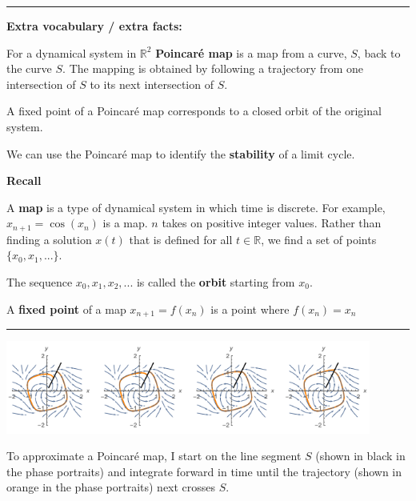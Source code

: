 \documentclass[12pt,letterpaper,noanswers]{exam}
\begin{document}
\vspace{0.2cm}
\hrule
\vspace{0.2cm}


\noindent \textbf{Extra vocabulary / extra facts:}
\begin{tcolorbox}
For a dynamical system in $\mathbb{R}^2$ \textbf{Poincar\'e map} is a map from a curve, $S$, back to the curve $S$.  The mapping is obtained by following a trajectory from one intersection of $S$ to its next intersection of $S$.

A fixed point of a Poincar\'e map corresponds to a closed orbit of the original system.

We can use the Poincar\'e map to identify the \textbf{stability} of a limit cycle. 

\end{tcolorbox}

\noindent\textbf{Recall}
\begin{tcolorbox}

A \textbf{map} is a type of dynamical system in which time is discrete.  For example, $x_{n+1} = \cos(x_n)$ is a map.  $n$ takes on positive integer values.  Rather than finding a solution $x(t)$ that is defined for all $t\in\mathbb{R}$, we find a set of points $\{x_0,x_1,...\}$.

The sequence $x_0,x_1,x_2,...$ is called the \textbf{orbit} starting from $x_0$.

A \textbf{fixed point} of a map $x_{n+1} = f(x_n)$ is a point where $f(x_n) = x_n$

 

\end{tcolorbox}

\vspace{0.2cm}

\hrule
\vspace{0.2cm}

\includegraphics[width=0.9\textwidth]{img/191018-C18p1.png}

To approximate a Poincar\'e map, I start on the line segment $S$ (shown in black in the phase portraits) and integrate forward in time until the trajectory (shown in orange in the phase portraits) next crosses $S$.
\end{document}
